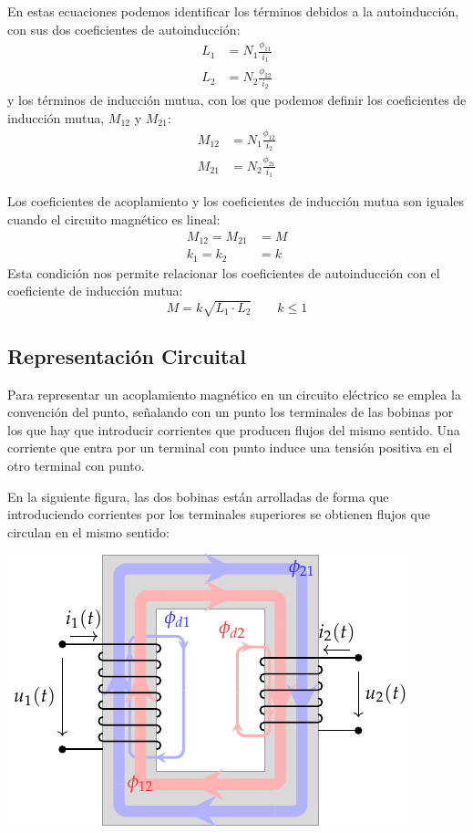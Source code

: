 En estas ecuaciones podemos identificar los términos debidos a la autoinducción, con sus dos coeficientes de autoinducción:
\begin{align}
  \label{eq:acoplamiento-autoinduccion}
  L_1 &= N_1 \frac{\phi_{11}}{i_1}\\
  L_2 &= N_2 \frac{\phi_{22}}{i_2}
\end{align}
y los términos de inducción mutua, con los que podemos definir los coeficientes de inducción mutua, $M_{12}$ y $M_{21}$:
\begin{align}
  \label{eq:coef-induccion-mutua}
  M_{12} &= N_1 \frac{\phi_{12}}{i_2}\\
  M_{21} &= N_2 \frac{\phi_{21}}{i_1}
\end{align}

Los coeficientes de acoplamiento y los coeficientes de inducción mutua son iguales cuando el circuito magnético es lineal:
  \begin{align*}
  M_{12} = M_{21} &= M\\
  k_1 = k_2 &= k    
  \end{align*}
  Esta condición nos permite relacionar los coeficientes de autoinducción con el coeficiente de inducción mutua:
  \begin{equation}
    \label{eq:L-M}
    \boxed{M = k \sqrt{L_1 \cdot L_2}} \qquad  k \leq 1
  \end{equation}

\subsection{Representación Circuital}
\label{sec:org1754ad3}
Para representar un acoplamiento magnético en un circuito eléctrico se
emplea la convención del punto, señalando con un punto los terminales
de las bobinas por los que hay que introducir corrientes que producen
flujos del mismo sentido. Una corriente que entra por un terminal con
punto induce una tensión positiva en el otro terminal con punto.

En la siguiente figura, las dos bobinas están arrolladas de forma que introduciendo corrientes por los terminales superiores se obtienen flujos que circulan en el mismo sentido:
\begin{center}
\includegraphics[height=0.2\textheight]{../figs/acoplamientoTikz.pdf}
\end{center}

